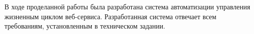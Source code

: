 \Conclusion %

В ходе проделанной работы была разработана система автоматизации управления жизненным циклом веб-сервиса.
Разработанная система отвечает всем требованиям, установленным в техническом задании.



